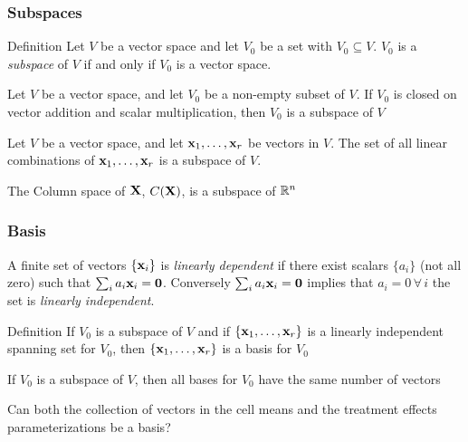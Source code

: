 \documentclass{beamer}
\begin{document}
\begin{frame}
  \frametitle{Subspaces}
  \begin{block}{Definition}
    Let $V$ be a vector space and let $V_0$ be a set with $V_0
    \subseteq V$.  $V_0$ is a {\it subspace} of $V$ if and only if
    $V_0$ is a vector space.
  \end{block} \pause

  \begin{theorem}
    Let $V$ be a vector space, and let $V_0$ be a non-empty subset of
    $V$.  If $V_0$ is closed on vector addition and scalar
    multiplication, then $V_0$ is a subspace of $V$
  \end{theorem}  \pause

  \begin{theorem}
    Let $V$ be a vector space, and let $\mathbf{x}_1, \ldots, \mathbf{x}_r$ be vectors
    in    $V$.  The set of all linear combinations of $\mathbf{x}_1, \ldots, \mathbf{x}_r$
    is a subspace of $V$.  \pause
  \end{theorem}
The Column space of $\mathbf{X}$, $C(\mathbf{X})$, is a subspace of $\mathbb{R}^n$
\end{frame}
\begin{frame}
  \frametitle{Basis}
  \begin{definition}
    A finite set of vectors $\{\mathbf{x}_i\}$ is {\it linearly dependent }
      if there exist scalars $\{a_i \}$ (not all zero) such that 
 $\sum_i    a_i \mathbf{x}_i = \mathbf{0}$.
\pause  Conversely  $\sum_i
        a_i \mathbf{x}_i = \mathbf{0}$ implies that $a_i = 0 \, \forall \,  i$ the set is
        {\it linearly independent}.
  \end{definition} \pause

  \begin{block}{Definition}
    If $V_0$ is a subspace of $V$ and if $\{\mathbf{x}_1, \ldots, \mathbf{x}_r \}$ is a
    linearly independent spanning set for $V_0$, then $\{\mathbf{x}_1, \ldots,
    \mathbf{x}_r \}$  is a basis for $V_0$
  \end{block} \pause

  \begin{theorem}
    If $V_0$ is a subspace of $V$, then all bases for $V_0$ have the
    same number of vectors
  \end{theorem} \pause
Can both the collection of vectors in the cell means 
and the treatment effects parameterizations be a basis?
\end{frame}
\end{document}
